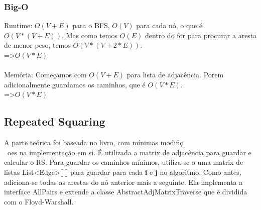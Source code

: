 \documentclass[a4paper,11pt,oneside]{article}
\begin{document}
    \subsubsection{Big-O}
    Runtime: \begin{math}O(V + E)\end{math} para o BFS, \begin{math}O(V)\end{math} para cada n\'o, o que \'e \begin{math}O(V * (V + E))\end{math}. Mas como temos \begin{math}O(E)\end{math} dentro do for para procurar a aresta de menor peso, temos \begin{math}O(V * (V + 2*E))\end{math}. \\
    =\textgreater \begin{math}O(V*E)\end{math} \\\\
    Mem\'oria: Come\c{c}amos com \begin{math}O(V+E)\end{math} para lista de adjac\^encia. Porem adicionalmente guardamos os caminhos, que \'e \begin{math}O(V * E)\end{math}. \\
    =\textgreater \begin{math}O(V * E)\end{math}
    
    \subsection{Repeated Squaring}
    A parte te\'orica foi baseada no livro, com m\'inimas modifi\c{c}\\~oes na implementa\c{c}\~ao em si. \'E utilizada a matrix de adjac\^encia para guardar e calcular o RS. Para guardar os caminhos m\'inimos, utiliza-se o uma matrix de listas List{\textless}Edge\textgreater[][] para guardar para cada \textbf{i} e \textbf{j} no algoritmo. Como antes, adiciona-se todas as arestas do n\'o anterior mais a seguinte. Ela implementa a interface AllPairs e extende a classe AbstractAdjMatrixTraverse que \'e dividida com o Floyd-Warshall.
\end{document}
